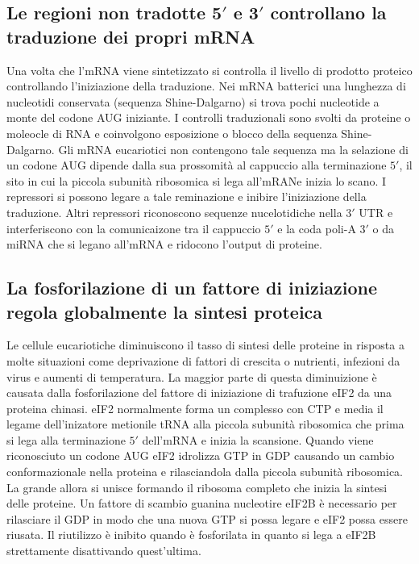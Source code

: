 \subsection{Le regioni non tradotte $\mathbf{5'}$ e $\mathbf{3'}$ controllano la traduzione dei propri mRNA}
Una volta che l'mRNA viene sintetizzato si controlla il livello di prodotto proteico controllando l'iniziazione della traduzione. Nei mRNA batterici una lunghezza di nucleotidi 
conservata (sequenza Shine-Dalgarno) si trova pochi nucleotide a monte del codone AUG iniziante. I controlli traduzionali sono svolti da proteine o moleocle di RNA e coinvolgono
esposizione o blocco della sequenza Shine-Dalgarno. Gli mRNA eucariotici non contengono tale sequenza ma la selazione di un codone AUG dipende dalla sua prossomit\`a al cappuccio alla
terminazione $5'$, il sito in cui la piccola subunit\`a ribosomica si lega all'mRANe inizia lo scano. I repressori si possono legare a tale reminazione e inibire l'iniziazione della
traduzione. Altri repressori riconoscono sequenze nucelotidiche nella $3'$ UTR e interferiscono con la comunicaizone tra il cappuccio $5'$ e la coda poli-A $3'$ o da miRNA che si legano
all'mRNA e ridocono l'output di proteine.
\subsection{La fosforilazione di un fattore di iniziazione regola globalmente la sintesi proteica}
Le cellule eucariotiche diminuiscono il tasso di sintesi delle proteine in risposta a molte situazioni come deprivazione di fattori di crescita o nutrienti, infezioni da virus e aumenti
di temperatura. La maggior parte di questa diminuizione \`e causata dalla fosforilazione del fattore di iniziazione di trafuzione eIF2 da una proteina chinasi. eIF2 normalmente forma
un complesso con CTP e media il legame dell'inizatore metionile tRNA alla piccola subunit\`a ribosomica che prima si lega alla terminazione $5'$ dell'mRNA e inizia la scansione. 
Quando viene riconosciuto un codone AUG eIF2 idrolizza GTP in GDP causando un cambio conformazionale nella proteina e rilasciandola dalla piccola subunit\`a ribosomica. La grande allora
si unisce formando il ribosoma completo che inizia la sintesi delle proteine. Un fattore di scambio guanina nucleotire eIF2B \`e necessario per rilasciare il GDP in modo che una nuova
GTP si possa legare e eIF2 possa essere riusata. Il riutilizzo \`e inibito quando \`e fosforilata in quanto si lega a eIF2B strettamente disattivando quest'ultima.
